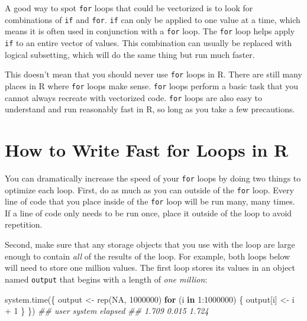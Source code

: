 \documentclass[
  letterpaper,
  DIV=11,
  numbers=noendperiod]{scrbook}
\newenvironment{Shaded}{\begin{snugshade}}{\end{snugshade}}
\newcommand{\ConstantTok}[1]{\textcolor[rgb]{0.56,0.35,0.01}{#1}}
\newcommand{\ControlFlowTok}[1]{\textcolor[rgb]{0.00,0.23,0.31}{\textbf{#1}}}
\newcommand{\DecValTok}[1]{\textcolor[rgb]{0.68,0.00,0.00}{#1}}
\newcommand{\DocumentationTok}[1]{\textcolor[rgb]{0.37,0.37,0.37}{\textit{#1}}}
\newcommand{\FunctionTok}[1]{\textcolor[rgb]{0.28,0.35,0.67}{#1}}
\newcommand{\NormalTok}[1]{\textcolor[rgb]{0.00,0.23,0.31}{#1}}
\newcommand{\OtherTok}[1]{\textcolor[rgb]{0.00,0.23,0.31}{#1}}
\newcommand{\SpecialCharTok}[1]{\textcolor[rgb]{0.37,0.37,0.37}{#1}}
\begin{document}
\begin{tcolorbox}[enhanced jigsaw, breakable, colback=white, colbacktitle=quarto-callout-tip-color!10!white, arc=.35mm, bottomrule=.15mm, coltitle=black, left=2mm, rightrule=.15mm, colframe=quarto-callout-tip-color-frame, leftrule=.75mm, opacitybacktitle=0.6, bottomtitle=1mm, toptitle=1mm, titlerule=0mm, opacityback=0, title=\textcolor{quarto-callout-tip-color}{\faLightbulb}\hspace{0.5em}{\texttt{if} and \texttt{for}}, toprule=.15mm]

A good way to spot \texttt{for} loops that could be vectorized is to
look for combinations of \texttt{if} and \texttt{for}. \texttt{if} can
only be applied to one value at a time, which means it is often used in
conjunction with a \texttt{for} loop. The \texttt{for} loop helps apply
\texttt{if} to an entire vector of values. This combination can usually
be replaced with logical subsetting, which will do the same thing but
run much faster.

\end{tcolorbox}

This doesn't mean that you should never use \texttt{for} loops in R.
There are still many places in R where \texttt{for} loops make sense.
\texttt{for} loops perform a basic task that you cannot always recreate
with vectorized code. \texttt{for} loops are also easy to understand and
run reasonably fast in R, so long as you take a few precautions.

\section{How to Write Fast for Loops in
R}\label{how-to-write-fast-for-loops-in-r}

You can dramatically increase the speed of your \texttt{for} loops by
doing two things to optimize each loop. First, do as much as you can
outside of the \texttt{for} loop. Every line of code that you place
inside of the \texttt{for} loop will be run many, many times. If a line
of code only needs to be run once, place it outside of the loop to avoid
repetition.

Second, make sure that any storage objects that you use with the loop
are large enough to contain \emph{all} of the results of the loop. For
example, both loops below will need to store one million values. The
first loop stores its values in an object named \texttt{output} that
begins with a length of \emph{one million}:

\begin{Shaded}
\begin{Highlighting}[]
\FunctionTok{system.time}\NormalTok{(\{}
\NormalTok{  output }\OtherTok{\textless{}{-}} \FunctionTok{rep}\NormalTok{(}\ConstantTok{NA}\NormalTok{, }\DecValTok{1000000}\NormalTok{) }
  \ControlFlowTok{for}\NormalTok{ (i }\ControlFlowTok{in} \DecValTok{1}\SpecialCharTok{:}\DecValTok{1000000}\NormalTok{) \{}
\NormalTok{    output[i] }\OtherTok{\textless{}{-}}\NormalTok{ i }\SpecialCharTok{+} \DecValTok{1}
\NormalTok{  \}}
\NormalTok{\})}
\DocumentationTok{\#\#   user  system elapsed }
\DocumentationTok{\#\#  1.709   0.015   1.724 }
\end{Highlighting}
\end{Shaded}
\end{document}
